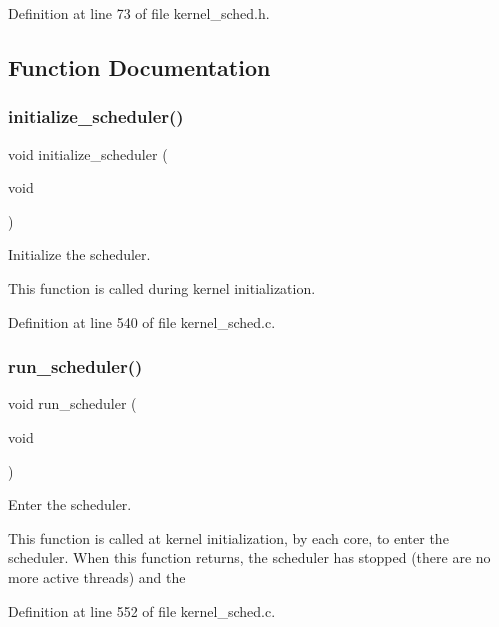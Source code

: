 Definition at line 73 of file kernel\+\_\+sched.\+h.



\subsection{Function Documentation}
\mbox{\label{group__scheduler_ga244fb594301322e79d11a7844c759bba}} 
\subsubsection{\texorpdfstring{initialize\+\_\+scheduler()}{initialize\_scheduler()}}
{\footnotesize\ttfamily void initialize\+\_\+scheduler (\begin{DoxyParamCaption}\item[{void}]{ }\end{DoxyParamCaption})}



Initialize the scheduler. 

This function is called during kernel initialization. 

Definition at line 540 of file kernel\+\_\+sched.\+c.

\mbox{\label{group__scheduler_ga147600b59d656eb9d9558673c2fad36d}} 
\subsubsection{\texorpdfstring{run\+\_\+scheduler()}{run\_scheduler()}}
{\footnotesize\ttfamily void run\+\_\+scheduler (\begin{DoxyParamCaption}\item[{void}]{ }\end{DoxyParamCaption})}



Enter the scheduler. 

This function is called at kernel initialization, by each core, to enter the scheduler. When this function returns, the scheduler has stopped (there are no more active threads) and the 

Definition at line 552 of file kernel\+\_\+sched.\+c.

